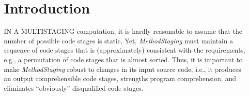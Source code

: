 \chapter{Introduction}{}
\label{sec:intro}

\lettrine[lraise=0.1, nindent=0em, slope=-.5em]{I}{N A MULTISTAGING } computation, it is 
hardly reasonable to assume that the number of possible code stages is static. Yet, \textit{MethodStaging}\cite{foo} must maintain a sequence of code stages that is (approximately) 
consistent with the requirements, e.g., a permutation of code stages that is almost sorted. Thus, 
it is important to make \textit{MethodStaging} robust to changes in its input source code, 
i.e., it produces an output comprehensible code stages, strengths program comprehension,  
and eliminates ``obviously'' disqualified code stages.